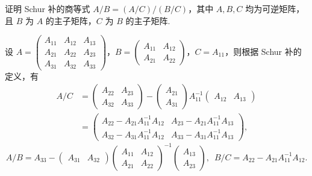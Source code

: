 \begin{exercise}
\begin{exgroup}
        \item 证明 Schur 补的商等式 $A/B=(A/C)/(B/C)$，其中 $A,B,C$ 均为可逆矩阵，且 $B$ 为 $A$ 的主子矩阵，$C$ 为 $B$ 的主子矩阵.
        \begin{answer}
            设 $A = \begin{pmatrix}
                    A_{11} & A_{12} & A_{13} \\
                    A_{21} & A_{22} & A_{23} \\
                    A_{31} & A_{32} & A_{33}
                \end{pmatrix}$，$B = \begin{pmatrix}
                    A_{11} & A_{12} \\
                    A_{21} & A_{22}
                \end{pmatrix}$，$C = A_{11}$，则根据 Schur 补的定义，有
                \begin{align*}
                    A/C &= \begin{pmatrix}
                        A_{22} & A_{23} \\
                        A_{32} & A_{33}
                    \end{pmatrix} - \begin{pmatrix}
                        A_{21} \\ A_{31}
                    \end{pmatrix} A_{11}^{-1} \begin{pmatrix}
                        A_{12} & A_{13}
                    \end{pmatrix} \\
                    &= \begin{pmatrix}
                        A_{22} - A_{21} A_{11}^{-1} A_{12} & A_{23} - A_{21} A_{11}^{-1} A_{13} \\
                        A_{32} - A_{31} A_{11}^{-1} A_{12} & A_{33} - A_{31} A_{11}^{-1} A_{13}
                    \end{pmatrix},
                \end{align*}
                \[
                    A/B = A_{33} - \begin{pmatrix}
                        A_{31} & A_{32}
                    \end{pmatrix} \begin{pmatrix}
                        A_{11} & A_{12} \\
                        A_{21} & A_{22}
                    \end{pmatrix}^{-1} \begin{pmatrix}
                        A_{13} \\ A_{23}
                    \end{pmatrix}, \enspace
                    B/C = A_{22} - A_{21} A_{11}^{-1} A_{12}.
                \]


\end{answer}
\end{exgroup}
\end{exercise}
